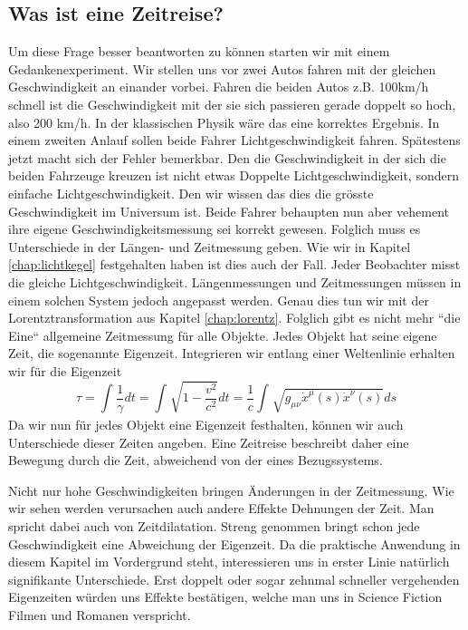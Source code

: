 \begin{refsection}
\section{Was ist eine Zeitreise?}
Um diese Frage besser beantworten zu können starten wir mit einem Gedankenexperiment. Wir stellen uns vor zwei Autos fahren mit der gleichen Geschwindigkeit an einander vorbei. Fahren die beiden Autos z.B. 100km/h schnell ist die Geschwindigkeit mit der sie sich passieren gerade doppelt so hoch, also 200 km/h. In der klassischen Physik wäre das eine korrektes Ergebnis. In einem zweiten Anlauf sollen beide Fahrer Lichtgeschwindigkeit fahren. Spätestens jetzt macht sich der Fehler bemerkbar. Den die Geschwindigkeit in der sich die beiden Fahrzeuge kreuzen ist nicht etwas Doppelte Lichtgeschwindigkeit, sondern einfache Lichtgeschwindigkeit. Den wir wissen das dies die grösste Geschwindigkeit im Universum ist.
Beide Fahrer behaupten nun aber vehement ihre eigene Geschwindigkeitsmessung sei korrekt gewesen. Folglich muss es Unterschiede in der Längen- und Zeitmessung geben.
Wie wir in Kapitel \ref{chap:lichtkegel} festgehalten haben ist dies auch der Fall. Jeder Beobachter misst die gleiche Lichtgeschwindigkeit. Längenmessungen und Zeitmessungen müssen in einem solchen System jedoch angepasst werden. Genau dies tun wir mit der Lorentztransformation aus Kapitel \ref{chap:lorentz}. Folglich gibt es nicht mehr ``die Eine`` allgemeine Zeitmessung für alle Objekte. Jedes Objekt hat seine eigene Zeit, die sogenannte Eigenzeit.
Integrieren wir entlang einer Weltenlinie erhalten wir für die Eigenzeit
\begin{equation}\label{Eigenzeit}
\tau
=
\int_{}^{}\frac{1}{\gamma}dt=\int_{}^{}\sqrt{1-\frac{v^2}{c^2}}dt
=
\frac{1}{c}\int_{}^{}\sqrt{g_{\mu\nu}\dot{x}^{\mu}(s)\dot{x}^{\nu}(s)}ds
\end{equation}
Da wir nun für jedes Objekt eine Eigenzeit festhalten, können wir auch Unterschiede dieser Zeiten angeben.
Eine Zeitreise beschreibt daher eine Bewegung durch die Zeit, abweichend von der eines Bezugssystems. 

Nicht nur hohe Geschwindigkeiten bringen Änderungen in der Zeitmessung. Wie wir sehen werden verursachen auch andere Effekte Dehnungen der Zeit. Man spricht dabei auch von Zeitdilatation.
Streng genommen bringt schon jede Geschwindigkeit eine Abweichung der Eigenzeit. Da die praktische Anwendung in diesem Kapitel im Vordergrund steht, interessieren uns in erster Linie natürlich signifikante Unterschiede. Erst doppelt oder sogar zehnmal schneller vergehenden Eigenzeiten w\"urden uns Effekte best\"atigen, welche man uns in Science Fiction Filmen und Romanen verspricht.


\end{refsection}
